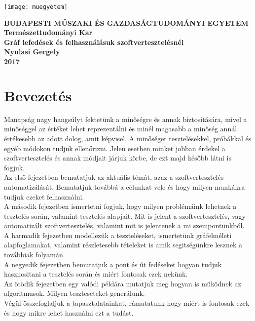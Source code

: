 \documentclass[12pt]{article}
\begin{document}
\begin{titlepage}
\centering
\texttt{[image: muegyetem]}

\bfseries\small{
BUDAPESTI MŰSZAKI ÉS GAZDASÁGTUDOMÁNYI EGYETEM
}\\
Természettudományi Kar\\
\vfill
\Large{Gráf lefedések és felhasználásuk szoftvertesztelésnél}\\
Nyulasi Gergely\\

\vfill
\vfill
2017
\end{titlepage}

\pagebreak

\tableofcontents

\pagebreak

\section{Bevezetés}

Manapság nagy hangsúlyt fektetünk a minőségre és annak biztosítására, mivel a minőséggel az értéket lehet reprezentálni és minél magasabb a minőség annál értékesebb az adott dolog, amit képvisel. A minőséget tesztelésekkel, próbákkal és egyéb módokon tudjuk ellenőrizni.
Jelen esetben minket jobban érdekel a szoftvertesztelés és annak módjait járjuk körbe, de ezt majd később látni is fogjuk.\\

Az első fejezetben bemutatjuk az aktuális témát, azaz a szoftvertesztelés automatizálását. Bemutatjuk továbbá a célunkat vele és hogy milyen munkákra tudjuk ezeket felhasználni.\\
A második fejezetben ismertetni fogjuk, hogy milyen problémáink lehetnek a tesztelés során, valamint tesztelés alapjait.
 Mit is jelent a szoftvertesztelés, vagy automatizált szoftvertesztelés, valamint mit is jelentenek a mi szempontunkból.\\
A harmadik fejezetben modellezük a teszteléseket, ismertetünk gráfelméleti alapfoglamakat, valamint részletesebb tételeket is amik segitségünkre lesznek a továbbiak folyamán.\\
A negyedik fejezetben bemutatjuk a pont és út fedéseket hogyan tudjuk hasznositani a tesztelés során és miért fontosak ezek nekünk.\\
Az ötödik fejezetben egy valódi példára mutatjuk meg hogyan is müködnek az algoritmusok. Milyen teszteseteket generálunk.\\
Végül összefoglaljuk a tapasztalatainkat, rámutatunk hogy miért is fontosak ezek és hogy mikre lehet használni ezt a tudást.\\
\end{document}
